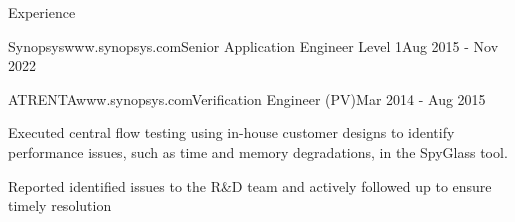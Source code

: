 \documentclass[
11pt, %
]{./assets/resume} %
\begin{document}
\begin{rSection}{Experience}
\begin{rSubsectionX}{Synopsys}{www.synopsys.com}{Senior Application Engineer Level 1}{Aug 2015 - Nov 2022}
	\end{rSubsectionX}
	\begin{rSubsectionX}{ATRENTA}{www.synopsys.com}{Verification Engineer (PV)}{Mar 2014 - Aug 2015}
		\item Executed central flow testing using in-house customer designs to identify performance issues, such as time and memory degradations, in the SpyGlass tool.
		\item Reported identified issues to the R\&D team and actively followed up to ensure timely resolution
	\end{rSubsectionX}
	
\end{rSection}


	

	


\end{document}
